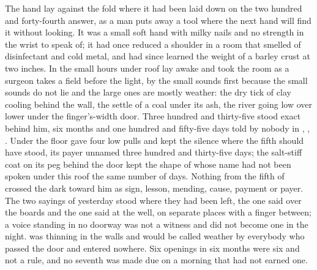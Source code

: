 
The hand lay against the fold where it had been laid down on the two hundred and forty-fourth answer, as a man puts away a tool where the next hand will find it without looking. It was a small soft hand with milky nails and no strength in the wrist to speak of; it had once reduced a shoulder in a room that smelled of disinfectant and cold metal, and had since learned the weight of a barley crust at two inches. In the small hours under  roof  lay awake and took the room as a surgeon takes a field before the light, by the small sounds first because the small sounds do not lie and the large ones are mostly weather: the dry tick of clay cooling behind the wall, the settle of a coal under its ash, the river going low over lower under the finger's-width door. Three hundred and thirty-five stood exact behind him, six months and one hundred and fifty-five days told by nobody in , , . Under the floor  gave four low pulls and kept the silence where the fifth should have stood, its payer unnamed three hundred and thirty-five days; the salt-stiff coat on its peg behind the door kept the shape of  whose name had not been spoken under this roof the same number of days. Nothing from the fifth of  crossed the dark toward him as sign, lesson, mending, cause, payment or payer. The two sayings of yesterday stood where they had been left, the one said over the boards and the one said at the well, on separate places with a finger between; a voice standing in no doorway was not a witness and did not become one in the night.  was thinning in the walls and would be called weather by everybody who passed the door and entered nowhere. Six openings in six months were six and not a rule, and no seventh was made due on a morning that had not earned one.

